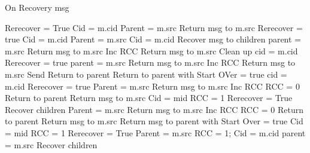 \documentclass{article}
\begin{document}
\begin{algorithm}
\caption{On Recovery msg}
\label{Recovery message received}
\begin{algorithmic}[1]
		\State Rerecover = True
		\State Cid = m.cid
		\State Parent = m.src
	\Else
		\State Return msg to m.src
		\State Rerecover = true
		\State Cid = m.cid
		\State Parent = m.src
	\EndIf
{}
	\State Cid = m.cid
	\State Recover msg to children
	\State parent = m.src
			\State Return msg to m.src
			\State Inc RCC
			\State Return msg to m.src
				\State Clean up
			\EndIf
		\Else
			\State cid = m.cid
			\State Rerecover = true
			\State parent = m.src
		\EndIf
	\Else
			\State Return msg to m.src
			\State Inc RCC
			\State Return msg to m.src
				\State Send Return to parent
			\EndIf
		\Else
			\State Return to parent with Start OVer = true
			\State cid = m.cid
			\State Rerecover = true
			\State Parent = m.src
		\EndIf
	\EndIf
{}
			\State Return msg to m.src
			\State Inc RCC
				\State RCC = 0
				\State Return to parent
			\EndIf
			\State Return msg to m.src
		\Else
			\State Cid = mid
			\State RCC = 1
				\State Rerecover = True	
			\Else 
				\State Recover children
			\EndIf
			\State Parent = m.src
		\EndIf
	\Else
			\State Return msg to m.src
			\State Inc RCC
				\State RCC = 0
				\State Return to parent
			\EndIf
			\State Return msg to m.src
		\Else
			\State Return msg to parent with Start Over = true
			\State Cid = mid
			\State RCC = 1
			\State Rerecover = True
			\State Parent = m.src
		\EndIf
	\EndIf
{}
	\State RCC = 1;
	\State Cid = m.cid
	\State parent = m.src
	\State Recover children
\EndIf
\EndProcedure
\end{algorithmic}
\end{algorithm}	
\end{document}
